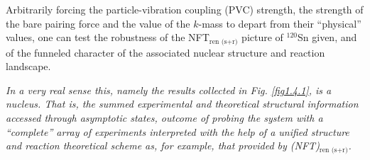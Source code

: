   
Arbitrarily forcing the particle-vibration coupling (PVC) strength, the strength of the bare pairing force and the value of the $k$-mass to depart from their ``physical'' values, one can test the robustness  of the NFT$_{\text{ren (s+r)}}$ picture of $^{120}$Sn given, and of the  funneled character of the associated nuclear structure and reaction landscape. 

\textit{
In a very real sense this, namely the results collected in Fig. \ref{fig1.4.1}, is a nucleus. That is, the summed experimental and theoretical structural information accessed through asymptotic states, outcome of probing the system with a ``complete'' array of experiments  interpreted with the help of a unified structure and reaction theoretical scheme as, for example, that provided by (NFT)$_{\text{ren (s+r)}}$.}


